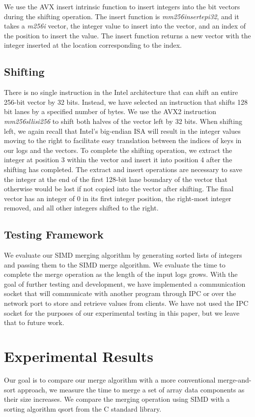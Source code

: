 \documentclass[10pt,twocolumn]{article}
\begin{document}
We use the AVX insert intrinsic function to insert integers into the bit vectors during the shifting operation.  The insert function is \textit{mm256insertepi32}, and it takes a \textit{m256i} vector, the integer value to insert into the vector, and an index of the position to insert the value.  The insert function returns a new vector with the integer inserted at the location corresponding to the index.

\subsection{Shifting}
There is no single instruction in the Intel architecture that can shift an entire 256-bit vector by 32 bits.  Instead, we have selected an instruction that shifts 128 bit lanes by a specified number of bytes.  We use the AVX2 instruction \textit{mm256sllisi256} to shift both halves of the vector left by 32 bits.  When shifting left, we again recall that Intel's big-endian ISA will result in the integer values moving to the right to facilitate easy translation between the indices of keys in our logs and the vectors.  To complete the shifting operation, we extract the integer at position 3 within the vector and insert it into position 4 after the shifting has completed.  The extract and insert operations are necessary to save the integer at the end of the first 128-bit lane boundary of the vector that otherwise would be lost if not copied into the vector after shifting.  The final vector has an integer of 0 in its first integer position, the right-most integer removed, and all other integers shifted to the right.

\subsection{Testing Framework}
We evaluate our SIMD merging algorithm by generating sorted lists of integers and passing them to the SIMD merge algorithm.  We evaluate the time to complete the merge operation as the length of the input logs grows.  With the goal of further testing and development, we have implemented a communication socket that will communicate with another program through IPC or over the network port to store and retrieve values from clients.  We have not used the IPC socket for the purposes of our experimental testing in this paper, but we leave that to future work.

\section{Experimental Results}
Our goal is to compare our merge algorithm with a more conventional merge-and-sort approach, we measure the time to merge a set of array data components as their size increases.  We compare the merging operation using SIMD with a sorting algorithm qsort from the C standard library.
\end{document}
